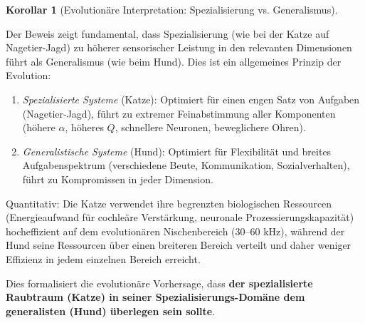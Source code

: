 ﻿\documentclass[12pt, a4paper]{article}
\theoremstyle{definition}
\newtheorem{korollar}{Korollar}[section]
\theoremstyle{remark}
\begin{document}
\begin{korollar}[Evolutionäre Interpretation: Spezialisierung vs. Generalismus]
\label{kor:specialization_vs_generalism}

Der Beweis zeigt fundamental, dass Spezialisierung (wie bei der Katze auf Nagetier-Jagd) zu höherer sensorischer Leistung in den relevanten Dimensionen führt als Generalismus (wie beim Hund). Dies ist ein allgemeines Prinzip der Evolution:

\begin{enumerate}

\item \emph{Spezialisierte Systeme} (Katze): Optimiert für einen engen Satz von Aufgaben (Nagetier-Jagd), führt zu extremer Feinabstimmung aller Komponenten (höhere $\alpha$, höheres $Q$, schnellere Neuronen, beweglichere Ohren).

\item \emph{Generalistische Systeme} (Hund): Optimiert für Flexibilität und breites Aufgabenspektrum (verschiedene Beute, Kommunikation, Sozialverhalten), führt zu Kompromissen in jeder Dimension.

\end{enumerate}

Quantitativ: Die Katze verwendet ihre begrenzten biologischen Ressourcen (Energieaufwand für cochleäre Verstärkung, neuronale Prozessierungskapazität) hocheffizient auf dem evolutionären Nischenbereich (30--60 kHz), während der Hund seine Ressourcen über einen breiteren Bereich verteilt und daher weniger Effizienz in jedem einzelnen Bereich erreicht.

Dies formalisiert die evolutionäre Vorhersage, dass \textbf{der spezialisierte Raubtraum (Katze) in seiner Spezialisierungs-Domäne dem generalisten (Hund) überlegen sein sollte}.

\end{korollar}
\end{document}
